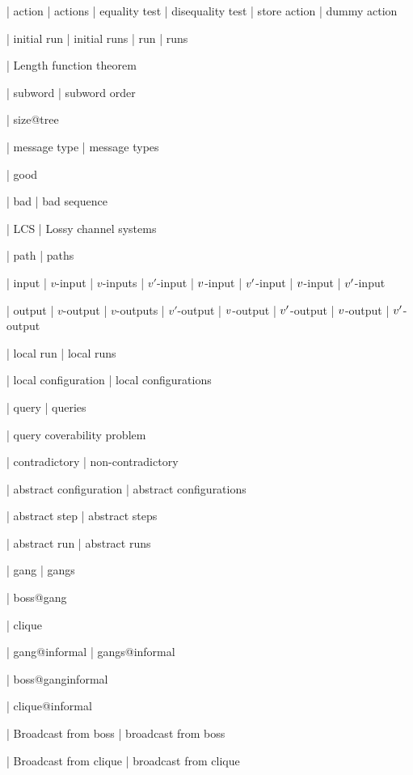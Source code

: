 | action
| actions
| equality test
| disequality test
| store action
| dummy action


| initial run
| initial runs
| run
| runs

| Length function theorem

| subword 
| subword order


| size@tree 

| message type
| message types

| good

| bad
| bad sequence

| LCS 
| Lossy channel systems

| path
| paths

| input
| $v$-input
| $v$-inputs
| $v'$-input
| $v$-input
| $v'$-input
| $v$-input
| $v'$-input

| output
| $v$-output
| $v$-outputs
| $v'$-output
| $v$-output
| $v'$-output
| $v$-output
| $v'$-output

| local run
| local runs

| local configuration
| local configurations

| query
| queries

| query coverability problem

| contradictory
| non-contradictory

| abstract configuration
| abstract configurations

| abstract step
| abstract steps


| abstract run
| abstract runs


| gang
| gangs

| boss@gang

| clique

| gang@informal
| gangs@informal

| boss@ganginformal

| clique@informal


| Broadcast from boss
| broadcast from boss

| Broadcast from clique
| broadcast from clique

